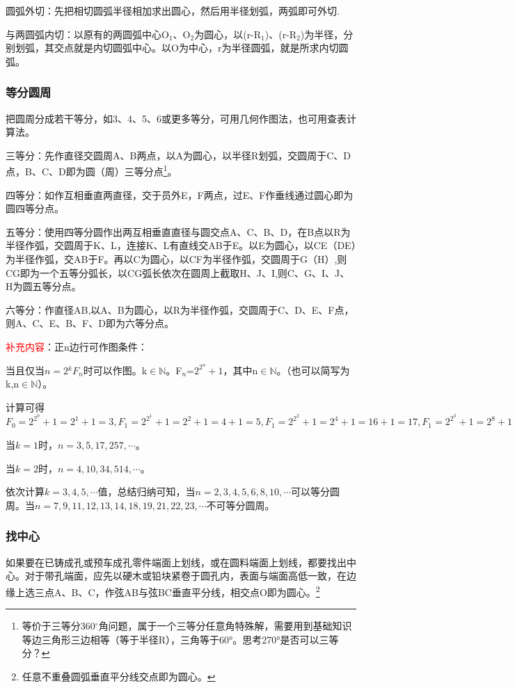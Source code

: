 \documentclass{ctexbook}
\begin{document}
圆弧外切：先把相切圆弧半径相加求出圆心，然后用半径划弧，两弧即可外切.

与两圆弧内切：以原有的两圆弧中心O$_1$、O$_{2}$为圆心，以(r-R$_1$)、(r-R$_2$)为半径，分别划弧，其交点就是内切圆弧中心。以O为中心，r为半径圆弧，就是所求内切圆弧。
\subsubsection{等分圆周}
把圆周分成若干等分，如3、4、5、6或更多等分，可用几何作图法，也可用查表计算法。

三等分：先作直径交圆周A、B两点，以A为圆心，以半径R划弧，交圆周于C、D点，B、C、D即为圆（周）三等分点\footnote{等价于三等分360$^{\circ}$角问题，属于一个三等分任意角特殊解，需要用到基础知识等边三角形三边相等（等于半径R），三角等于60°。思考270°是否可以三等分？}。

四等分：如作互相垂直两直径，交于员外E，F两点，过E、F作垂线通过圆心即为圆四等分点。

五等分：使用四等分圆作出两互相垂直直径与圆交点A、C、B、D，在B点以R为半径作弧，交圆周于K、L，连接K、L有直线交AB于E。以E为圆心，以CE（DE）为半径作弧，交AB于F。再以C为圆心，以CF为半径作弧，交圆周于G（H）,则CG即为一个五等分弧长，以CG弧长依次在圆周上截取H、J、I,则C、G、I、J、H为圆五等分点。

六等分：作直径AB,以A、B为圆心，以R为半径作弧，交圆周于C、D、E、F点，则A、C、E、B、F、D即为六等分点。

\textcolor{red}{\mbox{补充内容}}：正n边行可作图条件：

当且仅当$n=2{^k}F_{n}$时可以作图。k$\in \mathbb {N}$。F$_n$=$2^{2^{n}}+1$，其中n$\in \mathbb {N}$。（也可以简写为k,n$\in \mathbb{N}$）。

计算可得$F_{0}=2^{2^{0}}+1=2^1+1=3,F_{1}=2^{2^{1}}+1=2^{2}+1=4+1=5,F_{1}=2^{2^{2}}+1=2^{4}+1=16+1=17,F_{1}=2^{2^{3}}+1=2^{8}+1=256+1=257,F_{1}=2^{2^{4}}+1=2^{16}+1=65536+1=65537,\cdots$

当$k=1$时，$n=3,5,17,257,\cdots$。

当$k=2$时，$n=4,10,34,514,\cdots$。

依次计算$k=3,4,5,\cdots$值，总结归纳可知，当$n=2,3,4,5,6,8,10,\cdots$可以等分圆周。当$n=7,9,11,12,13,14,18,19,21,22,23,\cdots$不可等分圆周。
\subsubsection{找中心}
如果要在已铸成孔或预车成孔零件端面上划线，或在圆料端面上划线，都要找出中心。对于带孔端面，应先以硬木或铅块紧卷于圆孔内，表面与端面高低一致，在边缘上选三点A、B、C，作弦AB与弦BC垂直平分线，相交点O即为圆心。\footnote{任意不重叠圆弧垂直平分线交点即为圆心。}
\end{document}
